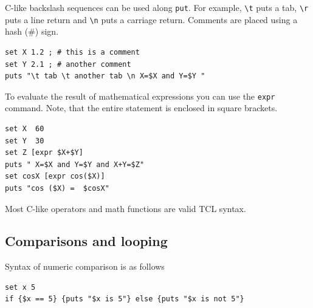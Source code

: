 \documentclass[
paper=a4,                       %
fontsize=11pt,                  %
twoside,                        %
footsepline,                    %
headsepline,                    %
headinclude=false,              %
footinclude=false,              %
pagesize,                       %
]{scrartcl}
\begin{document}
\noindent C-like backslash sequences can be used along \lstinline|put|. For example,
\texttt{\textbackslash{}t} puts a tab, \texttt{\textbackslash{}r} puts a line return and \texttt{\textbackslash{}n} puts a carriage
return. Comments are placed using a hash (\#) sign.

{\small\vspace{0,2cm}
\begin{lstlisting}[numbers=none]
set X 1.2 ;	# this is a comment
set Y 2.1 ;	# another comment
puts "\t tab \t another tab \n X=$X and Y=$Y "
\end{lstlisting}\vspace{0,2cm}
} 

\noindent To evaluate the result of mathematical expressions you can use the 
\lstinline|expr| command. Note, that the entire statement is enclosed in square brackets. 

{\small\vspace{0,2cm}
\begin{lstlisting}[numbers=none]
set X  60
set Y  30
set Z [expr $X+$Y]
puts " X=$X and Y=$Y and X+Y=$Z"
set cosX [expr cos($X)]
puts "cos ($X) =  $cosX"
\end{lstlisting}\vspace{0,2cm}
}

\noindent Most C-like operators and math functions are valid TCL syntax.

\subsection{Comparisons and looping}

Syntax of numeric comparison is as follows 

{\small\vspace{0,2cm}
\begin{lstlisting}[numbers=none]
set x 5
if {$x == 5} {puts "$x is 5"} else {puts "$x is not 5"}
\end{lstlisting}\vspace{0,2cm}
} 
      
\end{document}
